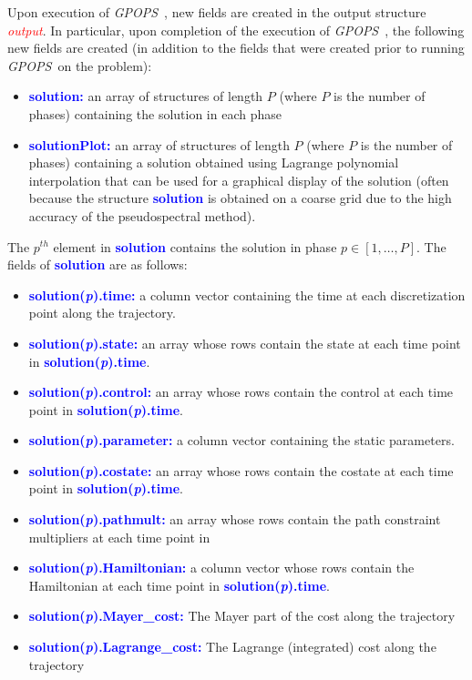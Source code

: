 \documentclass[10pt]{article}
\newcommand{\gpops}{{\em GPOPS}~}
\newcommand{\bfblue}[1]{\textcolor{blue}{\bf #1}}
\newcommand{\slred}[1]{\textcolor{red}{\sl #1}}
\begin{document}
Upon execution of \gpops, new fields are created in the output structure
\slred{output}.  In particular, upon completion of the execution of
\gpops, the following new fields are created (in addition to the fields
that were created prior to running \gpops on the problem):
\begin{itemize}
  \item \bfblue{solution:}  an array of structures of length $P$
   (where $P$ is the number of phases) containing the solution in each phase
  \item \bfblue{solutionPlot:}  an array of structures of length $P$
   (where $P$ is the number of phases) containing a solution obtained
   using Lagrange polynomial interpolation that can be used for a
   graphical display of the solution (often because the structure
   \bfblue{solution} is obtained on a coarse grid due to the high
   accuracy of the pseudospectral method).  
\end{itemize}
The $p^{th}$ element in \bfblue{solution} contains the solution in
phase $p\in[1,\ldots,P]$.  The fields of \bfblue{solution} are as follows:
\begin{itemize}
 \item \bfblue{solution(\textit{p}).time:} a column vector containing
  the time at each discretization point along the trajectory.  
 \item \bfblue{solution(\textit{p}).state:} an array whose rows
  contain the state at each time point in
  \bfblue{solution(\textit{p}).time}.   
 \item \bfblue{solution(\textit{p}).control:} an array whose rows
 contain the control at each time point in \bfblue{solution(\textit{p}).time}.   
\item \bfblue{solution(\textit{p}).parameter:}  a column vector
  containing the static parameters.  
 \item \bfblue{solution(\textit{p}).costate:} an array whose rows
contain the costate at each time point in \bfblue{solution(\textit{p}).time}.   
 \item \bfblue{solution(\textit{p}).pathmult:} an array whose rows
contain the path constraint multipliers at each time point in
 \item \bfblue{solution(\textit{p}).Hamiltonian:} a column vector
   whose rows contain the Hamiltonian at each time point in 
\bfblue{solution(\textit{p}).time}.    
\item  \bfblue{solution(\textit{p}).Mayer\_cost:}  The Mayer part of the cost along the trajectory
\item  \bfblue{solution(\textit{p}).Lagrange\_cost:}  The Lagrange (integrated) cost along the trajectory
\end{itemize}
\end{document}

